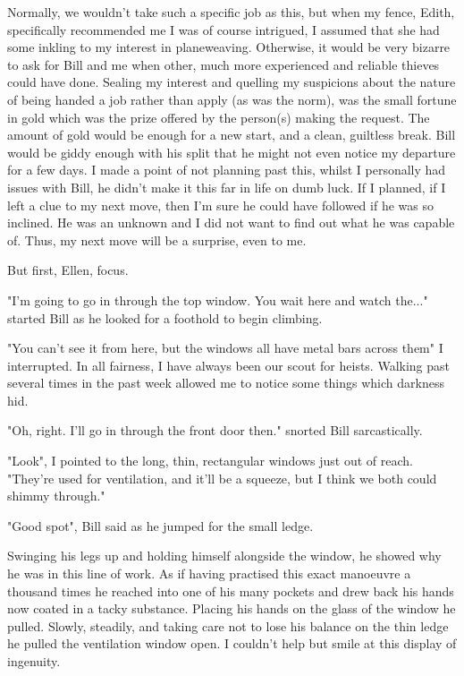 Normally, we wouldn't take such a specific job as this, but when my fence,
Edith, specifically recommended me I was of course intrigued, I assumed that she
had some inkling to my interest in planeweaving. Otherwise, it would be very
bizarre to ask for Bill and me when other, much more experienced and reliable
thieves could have done. Sealing my
interest and quelling my suspicions about the nature of being handed a job
rather than apply (as was the norm), was the small fortune in gold which was the
prize offered by the person(s) making the request. The amount of gold would be enough for a new
start, and a clean, guiltless break. Bill would be giddy enough with his split
that he might not even notice my departure for a few days. I made a point of not
planning past this, whilst I personally had issues with Bill, he didn't make it
this far in life on dumb luck. If I planned, if I left a clue to my next move,
then I'm sure he could have followed if he was so inclined. He was an unknown
and I did not want to find out what he was capable of. Thus, my next move will
be a surprise, even to me. 

But first, Ellen, focus. 

\begin{dialogue}
    \item{"I'm going to go in through the top window. You wait here and watch
    the..." started Bill as he looked for a foothold to begin climbing.}
    \item {"You can't see it from here, but the windows all have metal bars
    across them" I interrupted.
    In all fairness, I have always been our scout for heists. Walking past
    several times in the past week allowed me to notice some things which
    darkness hid.}
    \item{"Oh, right. I'll go in through the front door then." snorted Bill sarcastically.}
    \item{"Look", I pointed to the long, thin, rectangular windows just out of
    reach.
     "They're used for ventilation, and it'll be a squeeze, but I think we both could shimmy through."}
    \item{"Good spot", Bill said as he jumped for the small ledge.}
\end{dialogue}

Swinging his legs up and holding himself alongside the window, he showed why he
was in this line of work. As if having practised this exact manoeuvre a thousand
times he reached into one of his many pockets and drew back his hands now coated
in a tacky substance. Placing his hands on the glass of the window he pulled.
Slowly, steadily, and taking care not to lose his balance on the thin ledge he
pulled the ventilation window open. I couldn't help but smile at this display
of ingenuity. 

